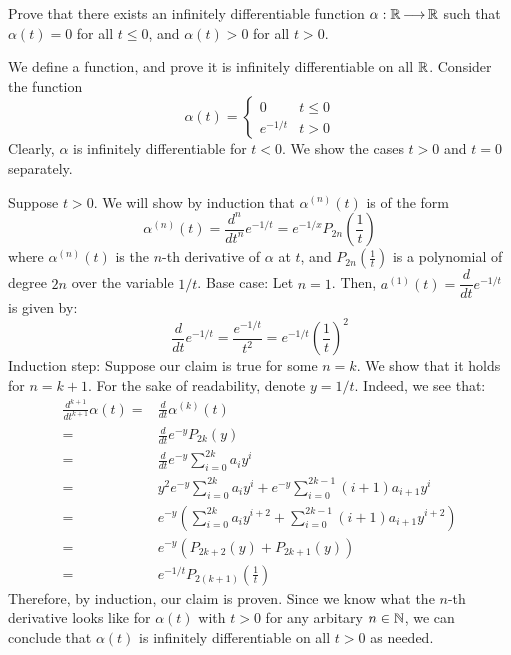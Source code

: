 \begin{qu}[num=4.1]
    Prove that there exists an infinitely differentiable function
    $ \alpha: \mathbb{R} \operatorname{\longrightarrow} \mathbb{R} $ such that $ \alpha(t) = 0 $ for all
    $ t \leq 0 $, and $ \alpha(t) > 0 $ for all $ t > 0 $.
\end{qu}

\begin{soln}
    We define a function, and prove it is infinitely differentiable on all
    $ \mathbb{R} $. Consider the function
    \begin{equation*}
        \alpha(t) = \begin{cases} 0 & t \leq 0 \\ e^{-1/t} & t > 0 \end{cases}
    \end{equation*}
    Clearly, $ \alpha $ is infinitely differentiable for $ t < 0 $.
    We show the cases $ t > 0 $ and $ t = 0 $ separately. \npgh

    Suppose $ t > 0 $. We will show by induction that $ \alpha^{(n)}(t) $ is of
    the form
    \begin{equation*}
        \alpha^{(n)}(t) = \frac{d^{n}}{dt^{n}} e^{-1/t} = e^{-1/x} P_{2n}
        \left( \frac{1}{t} \right)
    \end{equation*}
    where $ \alpha^{(n)}(t) $ is the $ n $-th derivative of $ \alpha $ at $ t $,
    and $ P_{2n}(\frac{1}{t}) $ is a polynomial of degree $ 2n $ over the
    variable $ 1/t $. \vsp
    Base case: Let $ n = 1 $.
    Then, $ a^{(1)}(t) = \dfrac{d}{dt} e^{-1/t} $ is given by:
    \begin{equation*}
        \frac{d}{dt} e^{-1/t} = \frac{e^{-1/t}}{t^{2}} = e^{-1/t}
        \left( \frac{1}{t} \right)^{2}
    \end{equation*}
    Induction step: Suppose our claim is true for some $ n = k $.
    We show that it holds for $ n = k +1 $.
    For the sake of readability, denote $ y = 1/t $. Indeed, we see that:
    \begin{align*}
        \frac{d^{k+1}}{dt^{k+1}} \alpha(t) = & \frac{d}{dt} \alpha^{(k)}(t) \\
                    = & \frac{d}{dt} e^{-y}P_{2k}(y) \\
                    = & \frac{d}{dt} e^{-y}\sum_{i = 0}^{2k} {a_{i}y^{i}} \\
                    = & y^{2} e^{-y} \sum_{i=0}^{2k} {a_{i}y^{i}}
                    + e^{-y} \sum_{i = 0}^{2k-1} {(i+1)a_{i+1}y^{i}} \\
                    = & e^{-y} \left( \sum_{i=0}^{2k} {a_{i}y^{i+2}}
                    + \sum_{i=0}^{2k-1} {(i+1)a_{i+1}y^{i+2}} \right) \\
                    = & e^{-y} \left( P_{2k+2}(y) + P_{2k+1}(y) \right) \\
                    = & e^{-1/t} P_{2(k+1)} \left( \frac{1}{t} \right)
    \end{align*}
    Therefore, by induction, our claim is proven.
    Since we know what the $ n $-th derivative looks like for $ \alpha(t) $ with
    $ t > 0 $ for any arbitary $ n \in \mathbb{N} $, we can conclude that
    $ \alpha(t) $ is infinitely differentiable on all $ t > 0 $ as needed. \npgh
    

\end{soln}
